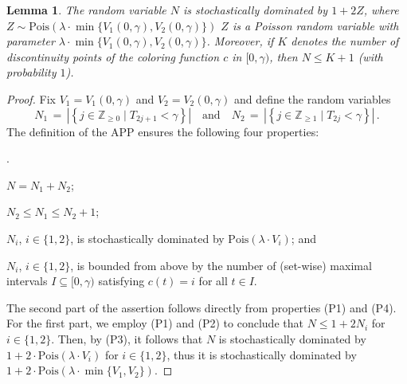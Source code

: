 \documentclass[11pt]{article}
\def\LongVersion{}
\def\LongVersionEnd{}
\def\ShortVersion{}
\def\ShortVersionEnd{}
\newtheorem{lemma}[theorem]{Lemma}
\theoremstyle{definition}
\theoremstyle{plain}
\newtheorem{lemma}[theorem]{Lemma}
\theoremstyle{definition}
\theoremstyle{plain}
\newtheorem{lemma}{Lemma}[section]
\theoremstyle{definition}
\theoremstyle{plain}
\newenvironment{DenseEnumerate}[1][\theenumi.]
{\begin{list}{#1}{\usecounter{enumi}
\itemsep 0pt \parsep 0pt \leftmargin 5mm \labelwidth 5mm \parskip 0pt \topsep
0pt}}
{\end{list}}
\newcommand{\Integers}{\mathbb{Z}}
\newcommand{\PoisDist}{\mathrm{Pois}}
\begin{document}
\ShortVersion \sloppy \ShortVersionEnd
\begin{lemma} \label{lemma:APP-bound-number-meaningful}
The random variable $N$ is stochastically dominated by
$1 + 2 Z$,
where
\LongVersion %
$Z \sim \PoisDist(\lambda \cdot \min \{ V_{1}(0, \gamma), V_{2}(0, \gamma) \})$
\LongVersionEnd %
%
\ShortVersion %
$Z$
\ShortVersionEnd %
is a Poisson random variable with parameter
$\lambda \cdot \min \{ V_{1}(0, \gamma), V_{2}(0, \gamma) \}$.
Moreover, if $K$ denotes the number of discontinuity points of the coloring
function $c$ in $[0, \gamma)$, then
$N \leq K + 1$
(with probability $1$).
\end{lemma}
\ShortVersion \par\fussy \ShortVersionEnd
%
\LongVersion %
\begin{proof}
Fix
$V_{1} = V_{1}(0, \gamma)$
and
$V_{2} = V_{2}(0, \gamma)$
and define the random variables
\[
N_{1}
\, = \,
\left| \left\{ j \in \Integers_{\geq 0} \mid T_{2 j + 1} < \gamma \right\}
\right|
\quad \text{and} \quad
N_{2}
\, = \,
\left| \left\{ j \in \Integers_{\geq 1} \mid T_{2 j} < \gamma \right\} \right|
\, .
\]
The definition of the APP ensures the following four properties:
\begin{DenseEnumerate}

\item[(P1)]
$N = N_{1} + N_{2}$;

\item[(P2)]
$N_{2} \leq N_{1} \leq N_{2} + 1$;

\item[(P3)]
$N_{i}$, $i \in \{ 1, 2 \}$, is stochastically dominated by $\PoisDist(\lambda
\cdot V_{i})$; and

\item[(P4)]
$N_{i}$, $i \in \{ 1, 2 \}$, is bounded from above by the number of (set-wise)
maximal intervals
$I \subseteq [0, \gamma)$
satisfying
$c(t) = i$
for all $t \in I$.

\end{DenseEnumerate}
The second part of the assertion follows directly from properties (P1) and
(P4).
For the first part, we employ (P1) and (P2) to conclude that
$N \leq 1 + 2 N_{i}$
for $i \in \{ 1, 2 \}$.
Then, by (P3), it follows that $N$ is stochastically dominated by
$1 + 2 \cdot \PoisDist(\lambda \cdot V_{i})$
for $i \in \{ 1, 2 \}$,
thus it is stochastically dominated by
$1 + 2 \cdot \PoisDist(\lambda \cdot \min\{ V_{1}, V_{2} \})$.
\end{proof}
\LongVersionEnd %
\end{document}
